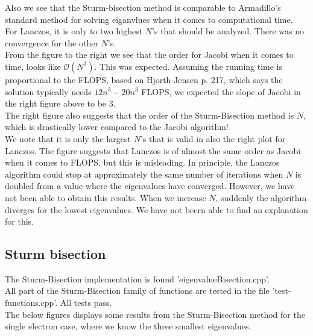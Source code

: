 \documentclass{article}
\begin{document}
Also we see that the Sturm-bisection method is comparable to Armadillo's standard method for solving eiganvlues when it comes to computational time. \\

For Lanczos, it is only to two highest $N$'s that should be analyzed. There was no convergence for the other $N$'s.\\

From the figure to the right we see that the order for Jacobi when it comes to time, looks like $\mathcal{O}(N^3).$ This was expected. Assuming the running time is proportional to the FLOPS, based on Hjorth-Jensen \cite{MHJ} p. 217, which says the solution typically needs $12n^3-20n^3$ FLOPS, we expected the slope of Jacobi in the right figure above to be 3. \\

The right figure also suggests that the order of the Sturm-Bisection method is $N$, which is drastically lower compared to the Jacobi algorithm! \\

We note that it is only the largest $N$'s that is valid in also the right plot for Lanczos. The figure suggests that Lanczos is of almost the same order as Jacobi when it comes to FLOPS, but this is misleading. In principle, the Lanczos algorithm could stop at approximately the same number of iterations when $N$ is doubled from a value where the eigenvalues have converged. However, we have not been able to obtain this results. When we increase $N$, suddenly the algorithm diverges for the lowest eigenvalues. We have not beern able to find an explanation for this.



\subsection{Sturm bisection}
The Sturm-Bisection implementation is found 'eigenvalueBisection.cpp'.\\

All part of the Sturm-Bisection family of functions are tested in the file 'test-functions.cpp'. All tests pass. \\

The below figures displays some results from the Sturm-Bisection method for the single electron case, where we know the three smallest eigenvalues.
\end{document}

